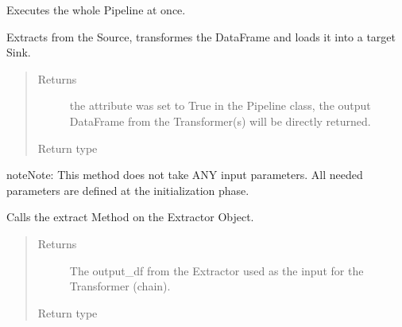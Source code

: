\documentclass[a4paper,10pt, twoside,english]{sphinxmanual}
\begin{document}
\begin{fulllineitems}
\begin{fulllineitems}
\label{\detokenize{pipeline/pipeline:spooq2.pipeline.pipeline.Pipeline.execute}}
Executes the whole Pipeline at once.

Extracts from the Source, transformes the DataFrame and loads it into a target Sink.
\begin{quote}\begin{description}
\item[{Returns}] \leavevmode
{} \textendash{}  the  attribute was set to True in the Pipeline class,
the output DataFrame from the Transformer(s) will be directly returned.

\item[{Return type}] \leavevmode
{}

\end{description}\end{quote}

\begin{sphinxadmonition}{note}{Note:}
This method does not take ANY input parameters. All needed parameters are defined
at the initialization phase.
\end{sphinxadmonition}

\end{fulllineitems}


\begin{fulllineitems}
\label{\detokenize{pipeline/pipeline:spooq2.pipeline.pipeline.Pipeline.extract}}
Calls the extract Method on the Extractor Object.
\begin{quote}\begin{description}
\item[{Returns}] \leavevmode
The output\_df from the Extractor used as the input for the Transformer (chain).

\item[{Return type}] \leavevmode
{}


\end{description}
\end{quote}
\end{fulllineitems}
\end{fulllineitems}
\end{document}
